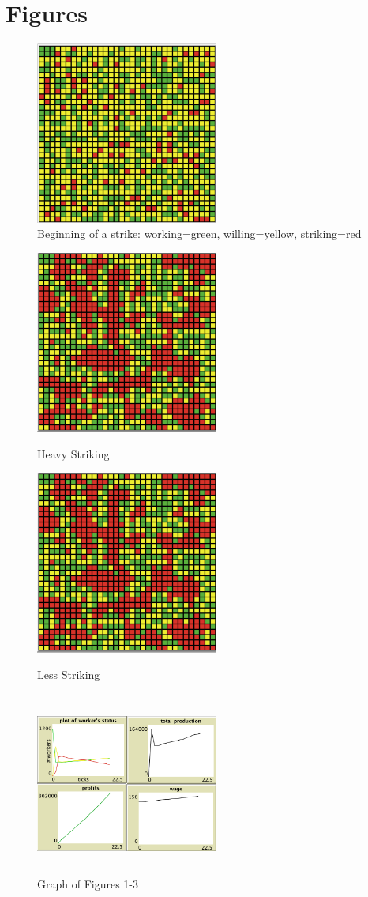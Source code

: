 \documentclass[11pt]{article}
\begin{document}
\section{Figures} \hrulefill
\begin{figure}[htbp]
	\centering
	\includegraphics[width=6cm, height=6cm]{verystart}
	\caption{Beginning of a strike: working=green, willing=yellow, striking=red}
\end{figure}
\begin{figure}[htbp]
	\centering
	\includegraphics[width=6cm, height=6cm]{heavystriking}
	\caption{Heavy Striking}
	\centering
	\includegraphics[width=6cm, height=6cm]{heavystriking}
	\caption{Less Striking}
	\centering
	\includegraphics[width=6cm, height=6cm]{graph1}
	\caption{Graph of Figures 1-3}
\end{figure}
\end{document}
